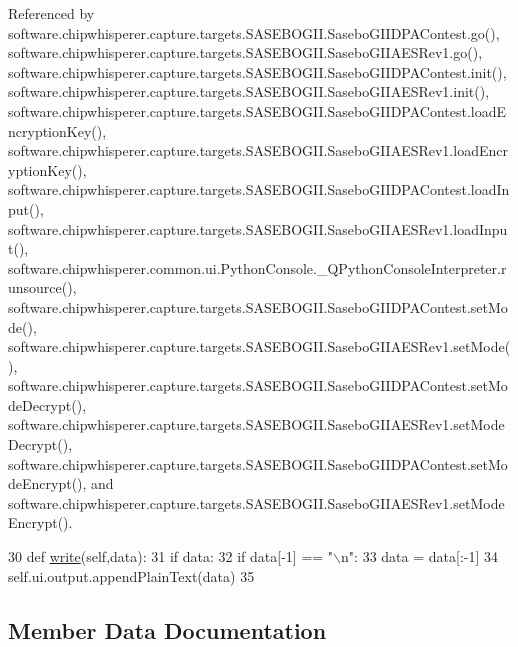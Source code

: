 Referenced by software.\+chipwhisperer.\+capture.\+targets.\+S\+A\+S\+E\+B\+O\+G\+I\+I.\+Sasebo\+G\+I\+I\+D\+P\+A\+Contest.\+go(), software.\+chipwhisperer.\+capture.\+targets.\+S\+A\+S\+E\+B\+O\+G\+I\+I.\+Sasebo\+G\+I\+I\+A\+E\+S\+Rev1.\+go(), software.\+chipwhisperer.\+capture.\+targets.\+S\+A\+S\+E\+B\+O\+G\+I\+I.\+Sasebo\+G\+I\+I\+D\+P\+A\+Contest.\+init(), software.\+chipwhisperer.\+capture.\+targets.\+S\+A\+S\+E\+B\+O\+G\+I\+I.\+Sasebo\+G\+I\+I\+A\+E\+S\+Rev1.\+init(), software.\+chipwhisperer.\+capture.\+targets.\+S\+A\+S\+E\+B\+O\+G\+I\+I.\+Sasebo\+G\+I\+I\+D\+P\+A\+Contest.\+load\+Encryption\+Key(), software.\+chipwhisperer.\+capture.\+targets.\+S\+A\+S\+E\+B\+O\+G\+I\+I.\+Sasebo\+G\+I\+I\+A\+E\+S\+Rev1.\+load\+Encryption\+Key(), software.\+chipwhisperer.\+capture.\+targets.\+S\+A\+S\+E\+B\+O\+G\+I\+I.\+Sasebo\+G\+I\+I\+D\+P\+A\+Contest.\+load\+Input(), software.\+chipwhisperer.\+capture.\+targets.\+S\+A\+S\+E\+B\+O\+G\+I\+I.\+Sasebo\+G\+I\+I\+A\+E\+S\+Rev1.\+load\+Input(), software.\+chipwhisperer.\+common.\+ui.\+Python\+Console.\+\_\+\+Q\+Python\+Console\+Interpreter.\+runsource(), software.\+chipwhisperer.\+capture.\+targets.\+S\+A\+S\+E\+B\+O\+G\+I\+I.\+Sasebo\+G\+I\+I\+D\+P\+A\+Contest.\+set\+Mode(), software.\+chipwhisperer.\+capture.\+targets.\+S\+A\+S\+E\+B\+O\+G\+I\+I.\+Sasebo\+G\+I\+I\+A\+E\+S\+Rev1.\+set\+Mode(), software.\+chipwhisperer.\+capture.\+targets.\+S\+A\+S\+E\+B\+O\+G\+I\+I.\+Sasebo\+G\+I\+I\+D\+P\+A\+Contest.\+set\+Mode\+Decrypt(), software.\+chipwhisperer.\+capture.\+targets.\+S\+A\+S\+E\+B\+O\+G\+I\+I.\+Sasebo\+G\+I\+I\+A\+E\+S\+Rev1.\+set\+Mode\+Decrypt(), software.\+chipwhisperer.\+capture.\+targets.\+S\+A\+S\+E\+B\+O\+G\+I\+I.\+Sasebo\+G\+I\+I\+D\+P\+A\+Contest.\+set\+Mode\+Encrypt(), and software.\+chipwhisperer.\+capture.\+targets.\+S\+A\+S\+E\+B\+O\+G\+I\+I.\+Sasebo\+G\+I\+I\+A\+E\+S\+Rev1.\+set\+Mode\+Encrypt().


\begin{DoxyCode}
30     \textcolor{keyword}{def }\hyperlink{classsoftware_1_1chipwhisperer_1_1common_1_1ui_1_1PythonConsole_1_1__QPythonConsoleInterpreter_a3222ab15ce893122c0c921f45ab5e62d}{write}(self,data):
31         \textcolor{keywordflow}{if} data:
32             \textcolor{keywordflow}{if} data[-1] == \textcolor{stringliteral}{"\(\backslash\)n"}:
33                 data = data[:-1]
34             self.ui.output.appendPlainText(data)
35 
\end{DoxyCode}


\subsection{Member Data Documentation}
\hypertarget{classsoftware_1_1chipwhisperer_1_1common_1_1ui_1_1PythonConsole_1_1__QPythonConsoleInterpreter_a5167337e752acb38c800ae701d58a2e7}{}
